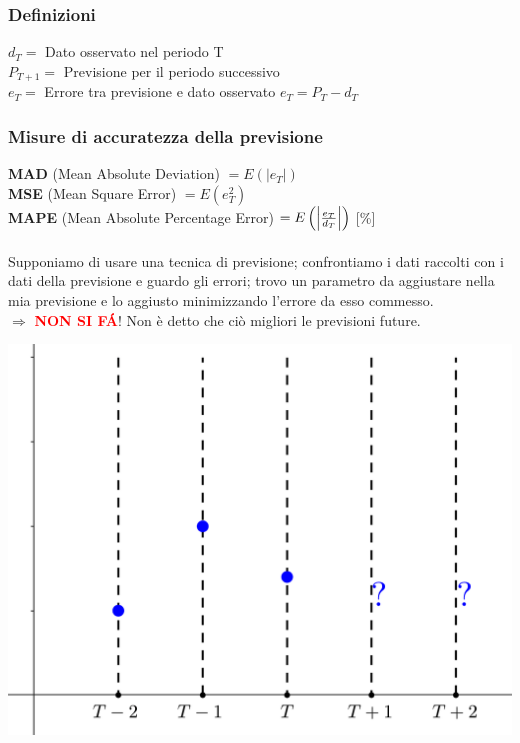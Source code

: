 \documentclass[12pt,a4paper]{article}
\begin{document}
\subsubsection{Definizioni}
$d_T = $ Dato osservato nel periodo T\\
$P_{T+1} =$ Previsione per il periodo successivo\\
$e_T = $ Errore tra previsione e dato osservato $e_T = P_T - d_T$\\

\subsubsection{Misure di accuratezza della previsione}
\textbf{MAD} (Mean Absolute Deviation) $= E(|e_T|)$\\
\textbf{MSE} (Mean Square Error) $= E\left(e_T^2\right)$\\
\textbf{MAPE} (Mean Absolute Percentage Error) $= E\left(\left|{e_T \over d_T}\right|\right)$ [\%]\\
\\
Supponiamo di usare una tecnica di previsione; confrontiamo i dati raccolti con i dati della previsione e guardo gli errori; trovo un parametro da aggiustare nella mia previsione e lo aggiusto minimizzando l'errore da esso commesso.\\
$\Rightarrow$ \textcolor{red}{\textbf{NON SI F\'A}}! Non è detto che ciò migliori le previsioni future.
\begin{center}
\includegraphics[width=0.4\columnwidth]{img/serie_temporali2.png}\\
\end{center}
\end{document}
